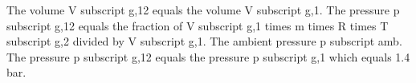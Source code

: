 The volume V subscript g,12 equals the volume V subscript g,1.
The pressure p subscript g,12 equals the fraction of V subscript g,1 times m times R times T subscript g,2 divided by V subscript g,1.
The ambient pressure p subscript amb.
The pressure p subscript g,12 equals the pressure p subscript g,1 which equals 1.4 bar.